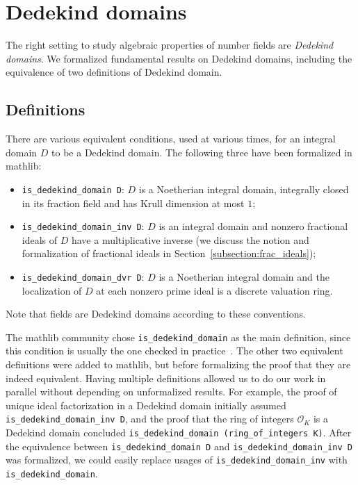 \documentclass[sn-mathphys]{sn-jnl}%
\newcommand{\lean}[1]{\texttt{#1}\xspace}
\newcommand*{\OK}[1][K]{\mathcal{O}_{#1}}
\newcommand{\mathlib}{\textsf{mathlib}\xspace}
\begin{document}
\section{Dedekind domains} \label{sec:Dedekind-domain}
The right setting to study algebraic properties of number fields are \emph{Dedekind domains}.
We formalized fundamental results on Dedekind domains, including the equivalence of two definitions of Dedekind domain.

\subsection{Definitions}\label{subsec:definitions_DD}
There are various equivalent conditions, used at various times, for an integral domain $D$ to be a Dedekind domain.
The following three have been formalized in \mathlib:
\begin{itemize}
\item \lean{is\_dedekind\_domain D}: $D$ is a Noetherian integral domain, integrally closed in its fraction field and has Krull dimension at most $1$;
\item \lean{is\_dedekind\_domain\_inv D}: $D$ is an integral domain and nonzero fractional ideals of $D$ have a multiplicative inverse (we discuss the notion and formalization of fractional ideals in Section~\ref{subsection:frac_ideals});
\item \lean{is\_dedekind\_domain\_dvr D}: $D$ is a Noetherian integral domain and the localization of $D$ at each nonzero prime ideal is a discrete valuation ring.
\end{itemize}
Note that fields are Dedekind domains according to these conventions.

The mathlib community chose \lean{is\_dedekind\_domain} as the main definition,
since this condition is usually the one checked in practice~\cite{Neukirch}.
The other two equivalent definitions were added to \mathlib, but before formalizing the proof that they are indeed equivalent.
Having multiple definitions allowed us to do our work in parallel without depending on unformalized results.
For example,
the proof of unique ideal factorization in a Dedekind domain initially assumed \lean{is\_dedekind\_domain\_inv D},
and the proof that the ring of integers $\OK$ is a Dedekind domain concluded \lean{is\_dedekind\_domain (ring\_of\_integers K)}.
After the equivalence between \lean{is\_dedekind\_domain D} and \lean{is\_dedekind\_domain\_inv D} was formalized,
we could easily replace usages of \lean{is\_dedekind\_domain\_inv} with \lean{is\_dedekind\_domain}.
\end{document}
